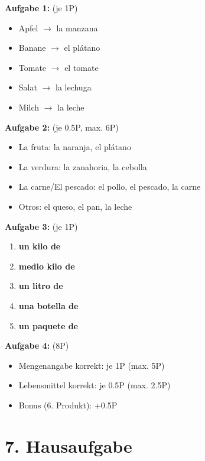 \documentclass[11pt, a4paper]{article}
\newcommand{\loesung}[1]{\textcolor{loesung}{\textbf{#1}}}
\begin{document}
\vspace{0.5em}

\textbf{Aufgabe 1:} (je 1P)
\begin{itemize}
    \item Apfel $\rightarrow$ la manzana
    \item Banane $\rightarrow$ el plátano
    \item Tomate $\rightarrow$ el tomate
    \item Salat $\rightarrow$ la lechuga
    \item Milch $\rightarrow$ la leche
\end{itemize}

\textbf{Aufgabe 2:} (je 0.5P, max. 6P)
\begin{itemize}
    \item La fruta: la naranja, el plátano
    \item La verdura: la zanahoria, la cebolla
    \item La carne/El pescado: el pollo, el pescado, la carne
    \item Otros: el queso, el pan, la leche
\end{itemize}

\textbf{Aufgabe 3:} (je 1P)
\begin{enumerate}[label=\alph*)]
    \item \loesung{un kilo de}
    \item \loesung{medio kilo de}
    \item \loesung{un litro de}
    \item \loesung{una botella de}
    \item \loesung{un paquete de}
\end{enumerate}

\textbf{Aufgabe 4:} (8P)
\begin{itemize}
    \item Mengenangabe korrekt: je 1P (max. 5P)
    \item Lebensmittel korrekt: je 0.5P (max. 2.5P)
    \item Bonus (6. Produkt): +0.5P
\end{itemize}


\section*{7. Hausaufgabe}
\end{document}
